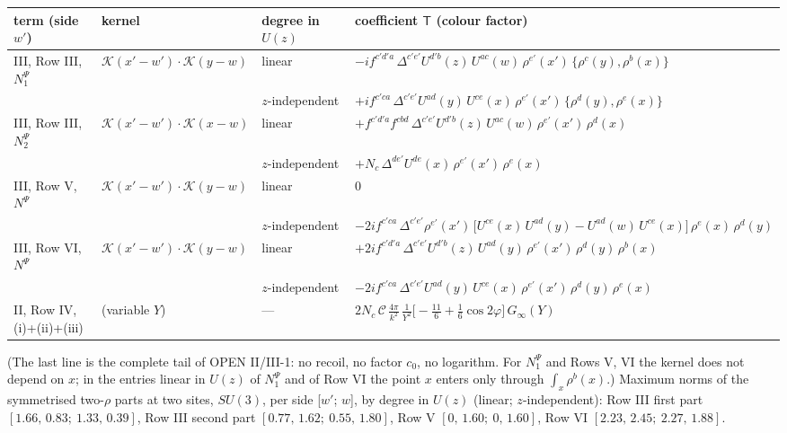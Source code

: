 \documentclass[9pt]{article}
\numberwithin{equation}{section}
\begin{document}
\begin{center}
\renewcommand{\arraystretch}{1.45}
\small\begin{tabular}{|l|l|l|l|}
\hline
term (side $w'$) & kernel & degree in $U(z)$ & coefficient $\mathsf{T}$ (colour factor) \\ \hline
III, Row III, $N_{1}^{\Psi}$ & $\mathcal{K}(x'-w')\!\cdot\!\mathcal{K}(y-w)$ & linear & $-i f^{c'd'a}\,\Delta^{c'e'}U^{d'b}(z)\,U^{ac}(w)\,\rho^{e'}(x')\,\{\rho^{c}(y),\rho^{b}(x)\}$ \\
 & & $z$-independent & $+i f^{c'ca}\,\Delta^{c'e'}U^{ad}(y)\,U^{ce}(x)\,\rho^{e'}(x')\,\{\rho^{d}(y),\rho^{e}(x)\}$ \\ \hline
III, Row III, $N_{2}^{\Psi}$ & $\mathcal{K}(x'-w')\!\cdot\!\mathcal{K}(x-w)$ & linear & $+f^{c'd'a}f^{cbd}\,\Delta^{c'e'}U^{d'b}(z)\,U^{ac}(w)\,\rho^{e'}(x')\,\rho^{d}(x)$ \\
 & & $z$-independent & $+N_{c}\,\Delta^{de'}U^{de}(x)\,\rho^{e'}(x')\,\rho^{e}(x)$ \\ \hline
III, Row V, $N^{\Psi}$ & $\mathcal{K}(x'-w')\!\cdot\!\mathcal{K}(y-w)$ & linear & $0$ \\
 & & $z$-independent & $-2i f^{c'ca}\,\Delta^{c'e'}\rho^{e'}(x')\,\big[U^{ce}(x)\,U^{ad}(y)-U^{ad}(w)\,U^{ce}(x)\big]\,\rho^{e}(x)\,\rho^{d}(y)$ \\ \hline
III, Row VI, $N^{\Psi}$ & $\mathcal{K}(x'-w')\!\cdot\!\mathcal{K}(y-w)$ & linear & $+2i f^{c'd'a}\,\Delta^{c'e'}U^{d'b}(z)\,U^{ad}(y)\,\rho^{e'}(x')\,\rho^{d}(y)\,\rho^{b}(x)$ \\
 & & $z$-independent & $-2i f^{c'ca}\,\Delta^{c'e'}U^{ad}(y)\,U^{ce}(x)\,\rho^{e'}(x')\,\rho^{d}(y)\,\rho^{e}(x)$ \\ \hline
II, Row IV, (i)+(ii)+(iii) & (variable $Y$) & --- & $2N_{c}\,\mathcal{C}\,\frac{4\pi}{k^{2}}\,\frac{1}{Y^{2}}\big[-\frac{11}{6}+\frac16\cos2\varphi\big]\,G_{\infty}(Y)$ \\ \hline
\end{tabular}
\end{center}
(The last line is the complete tail of OPEN II/III-1: no recoil, no factor $c_{0}$, no logarithm. For $N_{1}^{\Psi}$ and Rows V, VI the kernel does not depend on $x$; in the entries linear in $U(z)$ of $N_{1}^{\Psi}$ and of Row VI the point $x$ enters only through $\int_{x}\rho^{b}(x)$.) Maximum norms of the symmetrised two-$\rho$ parts at two sites, $SU(3)$, per side [$w'$; $w$], by degree in $U(z)$ (linear; $z$-independent): Row III first part $[1.66,\,0.83;\ 1.33,\,0.39]$, Row III second part $[0.77,\,1.62;\ 0.55,\,1.80]$, Row V $[0,\,1.60;\ 0,\,1.60]$, Row VI $[2.23,\,2.45;\ 2.27,\,1.88]$.\par
\end{document}
